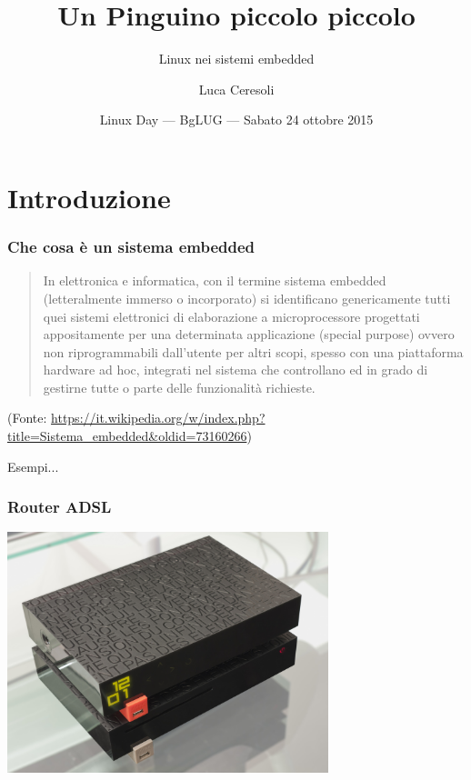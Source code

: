 \documentclass[xetex,table]{beamer}
\title{Un Pinguino piccolo piccolo}
\subtitle{Linux nei sistemi embedded}
\author{Luca Ceresoli}
\date{Linux Day --- BgLUG --- Sabato 24 ottobre 2015}
\begin{document}
\maketitle

\section{Introduzione}

\begin{frame}
  \frametitle{Che cosa è un sistema embedded}

  \blockquote{In elettronica e informatica, con il termine sistema
    embedded (letteralmente immerso o {\color{red} incorporato}) si
    identificano genericamente tutti quei {\color{violet} sistemi
      elettronici di elaborazione a microprocessore} progettati
    appositamente per una determinata applicazione
    ({\color{blue}special purpose}) ovvero non riprogrammabili
    dall'utente per altri scopi, spesso con una piattaforma
    {\color[rgb]{0,0.5,0} hardware ad hoc}, integrati nel sistema che
    controllano ed in grado di gestirne tutte o parte delle
    funzionalità richieste.}

  (Fonte:
  \url{https://it.wikipedia.org/w/index.php?title=Sistema_embedded&oldid=73160266})
\end{frame}

  \begin{frame}{}
    \huge
    \begin{center}
      Esempi...
    \end{center}
  \end{frame}

\begin{frame}
  \frametitle{Router ADSL}
  \begin{center}
    \includegraphics[width=0.7\textwidth]{images/freebox.jpg}
  \end{center}
\end{frame}
\end{document}
